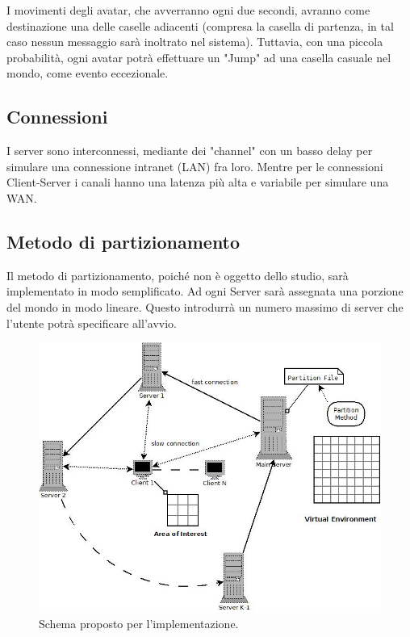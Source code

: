 \documentclass{article}
\begin{document}
I movimenti degli avatar, che avverranno ogni due secondi, avranno come
destinazione una delle caselle adiacenti (compresa la casella di partenza,
in tal caso nessun messaggio sarà inoltrato nel sistema). Tuttavia, con una
piccola probabilità, ogni avatar potrà effettuare un "Jump" ad una casella
casuale nel mondo, come evento eccezionale.

\subsection{Connessioni}
I server sono interconnessi, mediante dei "channel" con un basso delay
per simulare una connessione intranet (LAN) fra loro. Mentre per le connessioni
Client-Server i canali hanno una latenza più alta e variabile per 
simulare una WAN.

\subsection{Metodo di partizionamento}
Il metodo di partizionamento, poiché non è oggetto dello studio, sarà
implementato in modo semplificato. Ad ogni Server sarà assegnata una porzione
del mondo in modo lineare. Questo introdurrà un numero massimo di server che
l'utente potrà specificare all'avvio.

\begin{figure}
\label{fig2}
\begin{center}
\includegraphics[scale=0.50]{schemaRing.jpeg}
\end{center}
\caption{Schema proposto per l'implementazione.}
\end{figure}
\end{document}
